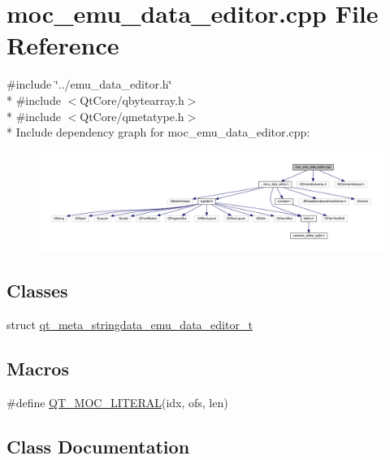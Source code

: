 \hypertarget{a00014}{\section{moc\+\_\+emu\+\_\+data\+\_\+editor.\+cpp File Reference}
\label{a00014}
}
{\ttfamily \#include \char`\"{}../emu\+\_\+data\+\_\+editor.\+h\char`\"{}}\\*
{\ttfamily \#include $<$Qt\+Core/qbytearray.\+h$>$}\\*
{\ttfamily \#include $<$Qt\+Core/qmetatype.\+h$>$}\\*
Include dependency graph for moc\+\_\+emu\+\_\+data\+\_\+editor.\+cpp\+:
\nopagebreak
\begin{figure}[H]
\begin{center}
\leavevmode
\includegraphics[width=350pt]{d6/d7d/a00161}
\end{center}
\end{figure}
\subsection*{Classes}
\begin{DoxyCompactItemize}
\item 
struct \hyperlink{a00014_d9/d77/a00095}{qt\+\_\+meta\+\_\+stringdata\+\_\+emu\+\_\+data\+\_\+editor\+\_\+t}
\end{DoxyCompactItemize}
\subsection*{Macros}
\begin{DoxyCompactItemize}
\item 
\#define \hyperlink{a00014_a75bb9482d242cde0a06c9dbdc6b83abe}{Q\+T\+\_\+\+M\+O\+C\+\_\+\+L\+I\+T\+E\+R\+A\+L}(idx, ofs, len)
\end{DoxyCompactItemize}


\subsection{Class Documentation}
\label{d9/d77/a00095}
\hypertarget{a00014_d9/d77/a00095}{}
